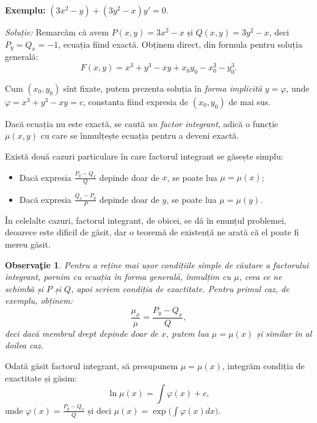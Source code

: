 \documentclass[11pt,a4paper]{article}
\theoremstyle{dotless}
\theoremstyle{dotlessdr}
\newtheorem{remark}{Observa\c{t}ie}[section]
\begin{document}
\vspace{1cm}

\textbf{Exemplu:} $(3x^2 - y) + (3y^2 - x) y' = 0$.

\emph{Soluție:} Remarcăm că avem $P(x, y) = 3x^2 - x$ și $Q(x, y) = 3y^2 - x$, deci
$P_y = Q_x = -1$, ecuația fiind exactă. Obținem direct, din formula pentru soluția generală:
\[
  F(x, y) = x^3 + y^3 - xy + x_0y_0 - x_0^3 - y_0^3.
\]

Cum $(x_0, y_0)$ sînt fixate, putem prezenta soluția în \emph{forma implicită} $y = \varphi$,
unde $\varphi = x^3 + y^3 - xy = c$, constanta fiind expresia de $(x_0, y_0)$ de mai sus.

\vspace{1cm}

Dacă ecuația nu este exactă, se caută \emph{un factor integrant}, adică o funcție $\mu(x, y)$
cu care se înmulțește ecuația pentru a deveni exactă.

Există două cazuri particulare în care factorul integrant se găsește simplu:
\begin{itemize}
\item Dacă expresia $\frac{P_y - Q_x}{Q}$ depinde doar de $x$, se poate lua $\mu = \mu(x)$;
\item Dacă expresia $\frac{Q_x - P_y}{P}$ depinde doar de $y$, se poate lua $\mu = \mu(y)$.
\end{itemize}

În celelalte cazuri, factorul integrant, de obicei, se dă în enunțul problemei, deoarece este
dificil de găsit, dar o teoremă de existență ne arată că el poate fi mereu găsit.

\begin{remark}\label{rk:int}
  Pentru a reține mai ușor condițiile simple de căutare a factorului integrant, pornim cu
  ecuația în forma generală, înmulțim cu $\mu$, ceea ce ne schimbă și $P$ și $Q$, apoi scriem
  condiția de exactitate. Pentru primul caz, de exemplu, obținem:
  \[
    \frac{\mu_x}{\mu} = \frac{P_y - Q_x}{Q},
  \]
  deci dacă membrul drept depinde doar de $x$, putem lua $\mu = \mu(x)$ și similar în al doilea caz.
\end{remark}

Odată găsit factorul integrant, să presupunem $\mu = \mu(x)$, integrăm condiția de exactitate și găsim:
\[
  \ln \mu(x) = \int \varphi(x) + c,
\]
unde $\varphi(x) = \frac{P_y - Q_x}{Q}$ și deci $\mu(x) = \exp \Big( \int \varphi(x) dx \Big)$.

\vspace{1cm}
\end{document}
